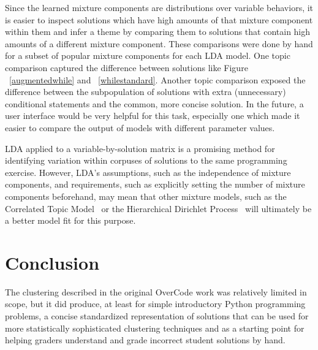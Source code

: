 Since the learned mixture components are distributions over variable behaviors, it is easier to inspect solutions which have high amounts of that mixture component within them and infer a theme by comparing them to solutions that contain high amounts of a different mixture component. These comparisons were done by hand for a subset of popular mixture components for each LDA model. One topic comparison captured the difference between solutions like Figure ~\ref{augmentedwhile} and ~\ref{whilestandard}. Another topic comparison exposed the difference between the subpopulation of solutions with extra (unnecessary) conditional statements and the common, more concise solution. In the future, a user interface would be very helpful for this task, especially one which made it easier to compare the output of models with different parameter values. 

LDA applied to a variable-by-solution matrix is a promising method for identifying variation within corpuses of solutions to the same programming exercise. However, LDA's assumptions, such as the independence of mixture components, and requirements, such as explicitly setting the number of mixture components beforehand, may mean that other mixture models, such as the Correlated Topic Model~\cite{} or the Hierarchical Dirichlet Process~\cite{} will ultimately be a better model fit for this purpose.



\section{Conclusion}
The clustering described in the original OverCode work was relatively limited in scope, but it did produce, at least for simple introductory Python programming problems, a concise standardized representation of solutions that can be used for more statistically sophisticated clustering techniques and as a starting point for helping graders understand and grade incorrect student solutions by hand.

